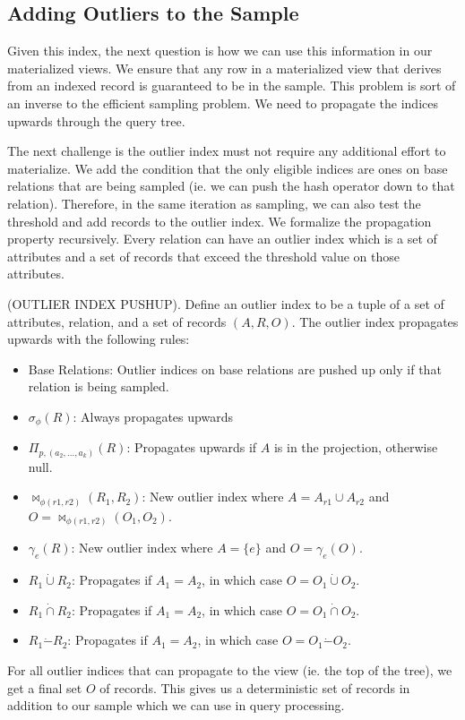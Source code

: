 \subsection{Adding Outliers to the Sample}
Given this index, the next question is how we can use this information in our materialized views.
We ensure that any row in a materialized view that derives from an indexed record is guaranteed to be in the sample.
This problem is sort of an inverse to the efficient sampling problem.
We need to propagate the indices upwards through the query tree.

The next challenge is the outlier index must not require any additional effort to materialize.
We add the condition that the only eligible indices are ones on base relations that are being sampled (ie. we can push the hash operator down to that relation).
Therefore, in the same iteration as sampling, we can also test the threshold and add records to the outlier index.
We formalize the propagation property recursively. 
Every relation can have an outlier index which is a set of attributes and a set of records that exceed the threshold value on those attributes.

\begin{definition}
(OUTLIER INDEX PUSHUP). Define an outlier index to be a tuple of a set of attributes, relation, and a set of records $(A,R,O)$. The outlier index propagates upwards with the following rules:
\begin{itemize}\vspace{-.45em}
\item Base Relations: Outlier indices on base relations are pushed up only if that relation is being sampled.\vspace{-.45em}
\item $\sigma_{\phi}(R)$: Always propagates upwards \vspace{-.45em}
\item $\Pi_{p,(a_2,...,a_k)}(R)$: Propagates upwards if $A$ is in the projection, otherwise null.\vspace{-.45em}
\item $\bowtie_{\phi (r1,r2)}(R_1,R_2)$: New outlier index where $A=A_{r1} \cup A_{r2}$ and $O = \bowtie_{\phi (r1,r2)}(O_1,O_2)$.
\item $\gamma_{e}(R)$: New outlier index where $A=\{e\}$ and $O = \gamma_{e}(O)$.\vspace{-.45em}
\item $R_1 \dot{\cup} R_2$: Propagates if $A_1 = A_2$, in which case $O = O_1 \dot{\cup} O_2$.
\item $R_1 \dot{\cap} R_2$: Propagates if $A_1 = A_2$, in which case $O = O_1 \dot{\cap} O_2$.
\item $R_1 \dot{-} R_2$: Propagates if $A_1 = A_2$, in which case $O = O_1 \dot{-} O_2$.
\end{itemize}
\end{definition}
For all outlier indices that can propagate to the view (ie. the top of the tree), we get a final set $O$ of records. 
This gives us a deterministic set of records in addition to our sample which we can use in query processing.

